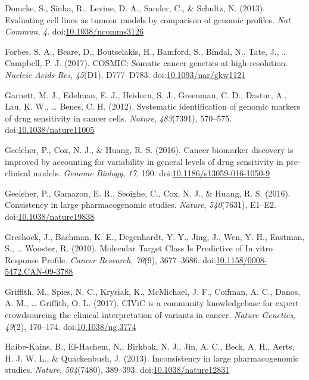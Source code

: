 \documentclass[man]{apa6}
\begin{document}
\hypertarget{ref-domcke2013}{}
Domcke, S., Sinha, R., Levine, D. A., Sander, C., \& Schultz, N. (2013).
Evaluating cell lines as tumour models by comparison of genomic
profiles. \emph{Nat Commun}, \emph{4}.
doi:\href{https://doi.org/10.1038/ncomms3126}{10.1038/ncomms3126}

\hypertarget{ref-forbes2017}{}
Forbes, S. A., Beare, D., Boutselakis, H., Bamford, S., Bindal, N.,
Tate, J., \ldots{} Campbell, P. J. (2017). COSMIC: Somatic cancer
genetics at high-resolution. \emph{Nucleic Acids Res}, \emph{45}(D1),
D777--D783.
doi:\href{https://doi.org/10.1093/nar/gkw1121}{10.1093/nar/gkw1121}

\hypertarget{ref-garnett2012}{}
Garnett, M. J., Edelman, E. J., Heidorn, S. J., Greenman, C. D., Dastur,
A., Lau, K. W., \ldots{} Benes, C. H. (2012). Systematic identification
of genomic markers of drug sensitivity in cancer cells. \emph{Nature},
\emph{483}(7391), 570--575.
doi:\href{https://doi.org/10.1038/nature11005}{10.1038/nature11005}

\hypertarget{ref-geeleher2016}{}
Geeleher, P., Cox, N. J., \& Huang, R. S. (2016). Cancer biomarker
discovery is improved by accounting for variability in general levels of
drug sensitivity in pre-clinical models. \emph{Genome Biology},
\emph{17}, 190.
doi:\href{https://doi.org/10.1186/s13059-016-1050-9}{10.1186/s13059-016-1050-9}

\hypertarget{ref-geeleher2016a}{}
Geeleher, P., Gamazon, E. R., Seoighe, C., Cox, N. J., \& Huang, R. S.
(2016). Consistency in large pharmacogenomic studies. \emph{Nature},
\emph{540}(7631), E1--E2.
doi:\href{https://doi.org/10.1038/nature19838}{10.1038/nature19838}

\hypertarget{ref-greshock2010}{}
Greshock, J., Bachman, K. E., Degenhardt, Y. Y., Jing, J., Wen, Y. H.,
Eastman, S., \ldots{} Wooster, R. (2010). Molecular Target Class Is
Predictive of In vitro Response Profile. \emph{Cancer Research},
\emph{70}(9), 3677--3686.
doi:\href{https://doi.org/10.1158/0008-5472.CAN-09-3788}{10.1158/0008-5472.CAN-09-3788}

\hypertarget{ref-griffith2017}{}
Griffith, M., Spies, N. C., Krysiak, K., McMichael, J. F., Coffman, A.
C., Danos, A. M., \ldots{} Griffith, O. L. (2017). CIViC is a community
knowledgebase for expert crowdsourcing the clinical interpretation of
variants in cancer. \emph{Nature Genetics}, \emph{49}(2), 170--174.
doi:\href{https://doi.org/10.1038/ng.3774}{10.1038/ng.3774}

\hypertarget{ref-haibe-kains2013}{}
Haibe-Kains, B., El-Hachem, N., Birkbak, N. J., Jin, A. C., Beck, A. H.,
Aerts, H. J. W. L., \& Quackenbush, J. (2013). Inconsistency in large
pharmacogenomic studies. \emph{Nature}, \emph{504}(7480), 389--393.
doi:\href{https://doi.org/10.1038/nature12831}{10.1038/nature12831}
\end{document}
